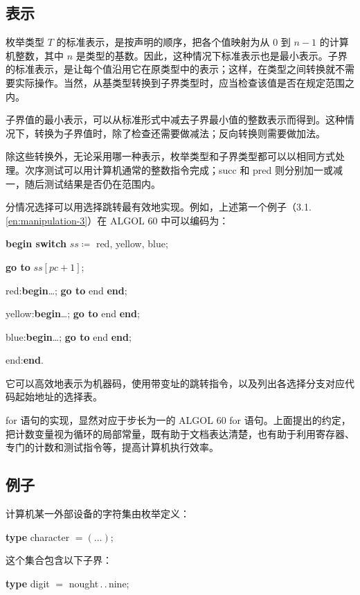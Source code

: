 \documentclass[twoside,11pt,fontset=none]{ctexbook}
\begin{document}
\subsection{表示}

枚举类型 $T$ 的标准表示，是按声明的顺序，把各个值映射为从 0 到 $n - 1$ 的计算机整数，其中 $n$ 是类型的基数。因此，这种情况下标准表示也是最小表示。子界的标准表示，是让每个值沿用它在原类型中的表示；这样，在类型之间转换就不需要实际操作。当然，从基类型转换到子界类型时，应当检查该值是否在规定范围之内。

子界值的最小表示，可以从标准形式中减去子界最小值的整数表示而得到。这种情况下，转换为子界值时，除了检查还需要做减法；反向转换则需要做加法。

除这些转换外，无论采用哪一种表示，枚举类型和子界类型都可以以相同方式处理。次序测试可以用计算机通常的整数指令完成；succ 和 pred 则分别加一或减一，随后测试结果是否仍在范围内。

分情况选择可以用选择跳转最有效地实现。例如，上述第一个例子（3.1.\ref{en:manipulation-3}）在 ALGOL 60 中可以编码为：

\quad \textbf{begin switch} $ss \coloneq$ red, yellow, blue;

\quad \quad \textbf{go to} $ss[pc + 1]$;

\quad \quad red:\textbf{begin}\dots; \textbf{go to} end \textbf{end};

\quad \quad yellow:\textbf{begin}\dots; \textbf{go to} end \textbf{end};

\quad \quad blue:\textbf{begin}\dots; \textbf{go to} end \textbf{end};

\quad end:\textbf{end}. 

它可以高效地表示为机器码，使用带变址的跳转指令，以及列出各选择分支对应代码起始地址的选择表。

for 语句的实现，显然对应于步长为一的 ALGOL 60 for 语句。上面提出的约定，把计数变量视为循环的局部常量，既有助于文档表达清楚，也有助于利用寄存器、专门的计数和测试指令等，提高计算机执行效率。

\subsection{例子}
\label{sec:example-3-3}

计算机某一外部设备的字符集由枚举定义：

\quad \textbf{type} character $= (\dots)$;

\noindent
这个集合包含以下子界：

\quad \textbf{type} digit $=$ nought\,.\,.\,nine;
\end{document}
